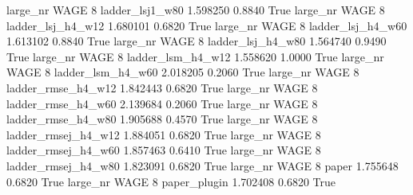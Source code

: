   large_nr     WAGE                 8     ladder_lsj1_w80    1.598250      0.8840    True
  large_nr     WAGE                 8   ladder_lsj_h4_w12    1.680101      0.6820    True
  large_nr     WAGE                 8   ladder_lsj_h4_w60    1.613102      0.8840    True
  large_nr     WAGE                 8   ladder_lsj_h4_w80    1.564740      0.9490    True
  large_nr     WAGE                 8   ladder_lsm_h4_w12    1.558620      1.0000    True
  large_nr     WAGE                 8   ladder_lsm_h4_w60    2.018205      0.2060    True
  large_nr     WAGE                 8  ladder_rmse_h4_w12    1.842443      0.6820    True
  large_nr     WAGE                 8  ladder_rmse_h4_w60    2.139684      0.2060    True
  large_nr     WAGE                 8  ladder_rmse_h4_w80    1.905688      0.4570    True
  large_nr     WAGE                 8 ladder_rmsej_h4_w12    1.884051      0.6820    True
  large_nr     WAGE                 8 ladder_rmsej_h4_w60    1.857463      0.6410    True
  large_nr     WAGE                 8 ladder_rmsej_h4_w80    1.823091      0.6820    True
  large_nr     WAGE                 8               paper    1.755648      0.6820    True
  large_nr     WAGE                 8        paper_plugin    1.702408      0.6820    True